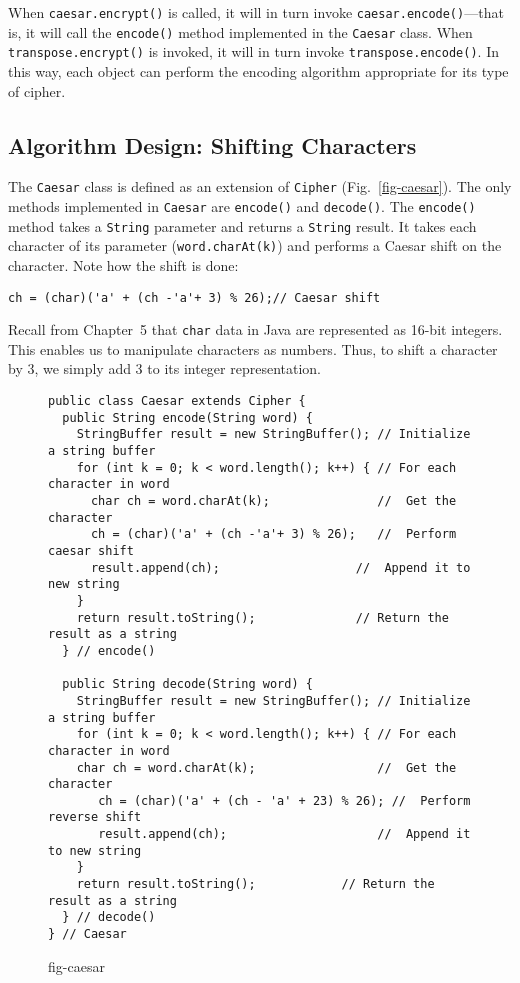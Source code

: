 \noindent When {\tt caesar.encrypt()} is called, it will in turn
invoke {\tt caesar.en\-code()}---that is, it will call the
{\tt encode()} method implemented in the {\tt Caesar} class.  When
{\tt transpose.encrypt()} is invoked, it will in turn invoke
{\tt trans\-pose.encode()}. In this way, each object can perform the encoding
algorithm appropriate for its type of 
cipher.

\subsection{Algorithm Design: Shifting Characters}
\noindent The {\tt Caesar} class is defined as an extension of {\tt Cipher}
(Fig.~\ref{fig-caesar}). The only methods implemented in {\tt Caesar}
are {\tt encode()} and {\tt decode()}. The {\tt encode()} method takes
a {\tt String} parameter and returns a {\tt String} result.  It takes
each character of its parameter ({\tt word.charAt(k)}) and performs a
Caesar shift on the character.  Note how the shift is done:

\begin{jjjlisting}
\begin{lstlisting}
ch = (char)('a' + (ch -'a'+ 3) % 26);// Caesar shift
\end{lstlisting}
\end{jjjlisting}

\noindent Recall from Chapter~5 that {\tt char} data in Java are
represented as 16-bit integers.  This enables us to manipulate
characters as numbers.  Thus, to shift a character by 3, we simply add
3 to its integer representation.

\begin{figure}[h]
\jjjprogstart
\begin{jjjlisting}[35pc]
\begin{lstlisting}
public class Caesar extends Cipher {
  public String encode(String word) {
    StringBuffer result = new StringBuffer(); // Initialize a string buffer
    for (int k = 0; k < word.length(); k++) { // For each character in word
      char ch = word.charAt(k);               //  Get the character
      ch = (char)('a' + (ch -'a'+ 3) % 26);   //  Perform caesar shift
      result.append(ch);                   //  Append it to new string
    }
    return result.toString();              // Return the result as a string
  } // encode()

  public String decode(String word) {
    StringBuffer result = new StringBuffer(); // Initialize a string buffer
    for (int k = 0; k < word.length(); k++) { // For each character in word
    char ch = word.charAt(k);                 //  Get the character
       ch = (char)('a' + (ch - 'a' + 23) % 26); //  Perform reverse shift
       result.append(ch);                     //  Append it to new string
    }
    return result.toString();            // Return the result as a string
  } // decode()
} // Caesar
\end{lstlisting}
\end{jjjlisting}
{fig-caesar}
\end{figure}

